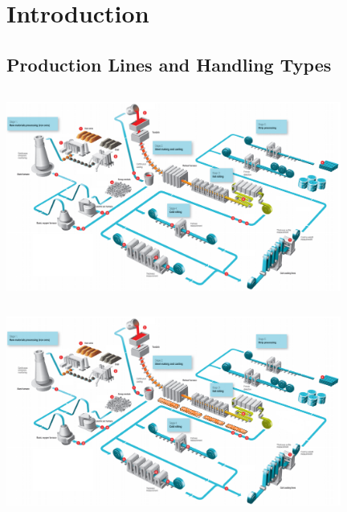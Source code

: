 \section[Introduction]{Introduction}
\subsection[Production Lines and Handling Types]{Production Lines and Handling Types}
\begin{frame}
	\begin{columns}[c]
		\hspace{-1.2cm}\includegraphics[width=11cm]{../images/steel-production-steps.png}
	\end{columns}
\end{frame}
\begin{frame}
	\begin{columns}[c]
		\hspace{-1.2cm}\includegraphics[width=11cm]{../tables/steel-production-steps_2.png}
	\end{columns}
\end{frame}

